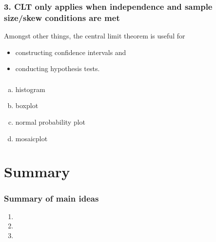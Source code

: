\documentclass[11pt,containsverbatim,handout,xcolor=xelatex,dvipsnames,table]{beamer}
\newcommand{\solnMult}[1]{#1}
\begin{document}

\begin{frame}
\frametitle{3. CLT only applies when independence and sample size/skew conditions are met}

Amongst other things, the central limit theorem is useful for 
\begin{itemize}
\item constructing confidence intervals and
\item conducting hypothesis tests.
\end{itemize}

\end{frame}


\begin{frame}
\frametitle{}


\begin{enumerate}[(a)]
\item histogram
\item boxplot
\item normal probability plot
\item \solnMult{mosaicplot}
\end{enumerate}


\end{frame}


\section{Summary}


\begin{frame}
\frametitle{Summary of main ideas}

\vfill

\begin{enumerate}

\item {}

\item {}

\item {}

\end{enumerate}

\vfill

\end{frame}
\end{document}

